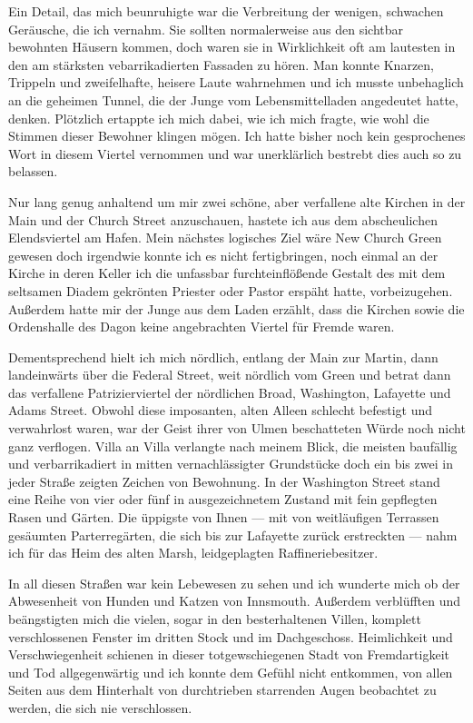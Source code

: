 Ein Detail, das mich beunruhigte war die Verbreitung der wenigen, schwachen Geräusche, die ich vernahm. Sie sollten normalerweise aus den sichtbar bewohnten Häusern kommen, doch waren sie in Wirklichkeit oft am lautesten in den am stärksten vebarrikadierten Fassaden zu hören. Man konnte Knarzen, Trippeln und zweifelhafte, heisere Laute wahrnehmen und ich musste unbehaglich an die geheimen Tunnel, die der Junge vom Lebensmittelladen angedeutet hatte, denken. Plötzlich ertappte ich mich dabei, wie ich mich fragte, wie wohl die Stimmen dieser Bewohner klingen mögen. Ich hatte bisher noch kein gesprochenes Wort in diesem Viertel vernommen und war unerklärlich bestrebt dies auch so zu belassen.

Nur lang genug anhaltend um mir zwei schöne, aber verfallene alte Kirchen in der Main und der Church Street anzuschauen, hastete ich aus dem abscheulichen Elendsviertel am Hafen. Mein nächstes logisches Ziel wäre New Church Green gewesen doch irgendwie konnte ich es nicht fertigbringen, noch einmal an der Kirche in deren Keller ich die unfassbar furchteinflößende Gestalt des mit dem seltsamen Diadem gekrönten Priester oder Pastor erspäht hatte, vorbeizugehen. Außerdem hatte mir der Junge aus dem Laden erzählt, dass die Kirchen sowie die Ordenshalle des Dagon keine angebrachten Viertel für Fremde waren.

Dementsprechend hielt ich mich nördlich, entlang der Main zur Martin, dann landeinwärts über die Federal Street, weit nördlich vom Green und betrat dann das verfallene Patrizierviertel der nördlichen Broad, Washington, Lafayette und Adams Street. Obwohl diese imposanten, alten Alleen schlecht befestigt und verwahrlost waren, war der Geist ihrer von Ulmen beschatteten Würde noch nicht ganz verflogen. Villa an Villa verlangte nach meinem Blick, die meisten baufällig und verbarrikadiert in mitten vernachlässigter Grundstücke doch ein bis zwei in jeder Straße zeigten Zeichen von Bewohnung. In der Washington Street stand eine Reihe von vier oder fünf in ausgezeichnetem Zustand mit fein gepflegten Rasen und Gärten. Die üppigste von Ihnen --- mit von weitläufigen Terrassen gesäumten Parterregärten, die sich bis zur Lafayette zurück erstreckten --- nahm ich für das Heim des alten Marsh, leidgeplagten Raffineriebesitzer.

In all diesen Straßen war kein Lebewesen zu sehen und ich wunderte mich ob der Abwesenheit von Hunden und Katzen von Innsmouth. Außerdem verblüfften und beängstigten mich die vielen, sogar in den besterhaltenen Villen, komplett verschlossenen Fenster im dritten Stock und im Dachgeschoss. Heimlichkeit und Verschwiegenheit schienen in dieser totgewschiegenen Stadt von Fremdartigkeit und Tod allgegenwärtig und ich konnte dem Gefühl nicht entkommen, von allen Seiten aus dem Hinterhalt von durchtrieben starrenden Augen beobachtet zu werden, die sich nie verschlossen.

